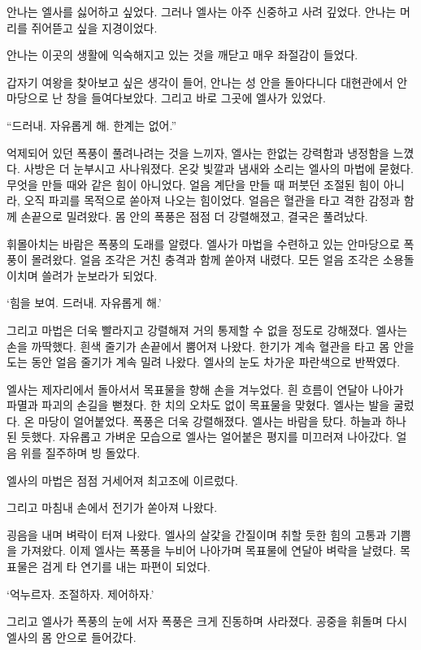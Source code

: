 안나는 엘사를 싫어하고 싶었다. 그러나 엘사는 아주 신중하고 사려 깊었다. 안나는 머리를 쥐어뜯고 싶을 지경이었다.

안나는 이곳의 생활에 익숙해지고 있는 것을 깨닫고 매우 좌절감이 들었다.

갑자기 여왕을 찾아보고 싶은 생각이 들어, 안나는 성 안을 돌아다니다 대현관에서 안마당으로 난 창을 들여다보았다. 그리고 바로 그곳에 엘사가 있었다.

\textbreak

\forceindent``드러내. 자유롭게 해. 한계는 없어.''

억제되어 있던 폭풍이 풀려나려는 것을 느끼자, 엘사는 한없는 강력함과 냉정함을 느꼈다. 사방은 더 눈부시고 사나워졌다. 온갖 빛깔과 냄새와 소리는 엘사의 마법에 묻혔다. 무엇을 만들 때와 같은 힘이 아니었다. 얼음 계단을 만들 때 퍼붓던 조절된 힘이 아니라, 오직 파괴를 목적으로 쏟아져 나오는 힘이었다. 얼음은 혈관을 타고 격한 감정과 함께 손끝으로 밀려왔다. 몸 안의 폭풍은 점점 더 강렬해졌고, 결국은 풀려났다.

휘몰아치는 바람은 폭풍의 도래를 알렸다. 엘사가 마법을 수련하고 있는 안마당으로 폭풍이 몰려왔다. 얼음 조각은 거친 충격과 함께 쏟아져 내렸다. 모든 얼음 조각은 소용돌이치며 쓸려가 눈보라가 되었다.

`힘을 보여. 드러내. 자유롭게 해.'

그리고 마법은 더욱 빨라지고 강렬해져 거의 통제할 수 없을 정도로 강해졌다. 엘사는 손을 까딱했다. 흰색 줄기가 손끝에서 뿜어져 나왔다. 한기가 계속 혈관을 타고 몸 안을 도는 동안 얼음 줄기가 계속 밀려 나왔다. 엘사의 눈도 차가운 파란색으로 반짝였다.

엘사는 제자리에서 돌아서서 목표물을 향해 손을 겨누었다. 흰 흐름이 연달아 나아가 파멸과 파괴의 손길을 뻗쳤다. 한 치의 오차도 없이 목표물을 맞혔다. 엘사는 발을 굴렀다. 온 마당이 얼어붙었다. 폭풍은 더욱 강렬해졌다. 엘사는 바람을 탔다. 하늘과 하나 된 듯했다. 자유롭고 가벼운 모습으로 엘사는 얼어붙은 평지를 미끄러져 나아갔다. 얼음 위를 질주하며 빙 돌았다.

엘사의 마법은 점점 거세어져 최고조에 이르렀다.

그리고 마침내 손에서 전기가 쏟아져 나왔다.

굉음을 내며 벼락이 터져 나왔다. 엘사의 살갗을 간질이며 취할 듯한 힘의 고통과 기쁨을 가져왔다. 이제 엘사는 폭풍을 누비어 나아가며 목표물에 연달아 벼락을 날렸다. 목표물은 검게 타 연기를 내는 파편이 되었다.

`억누르자. 조절하자. 제어하자.'

그리고 엘사가 폭풍의 눈에 서자 폭풍은 크게 진동하며 사라졌다. 공중을 휘돌며 다시 엘사의 몸 안으로 들어갔다.

